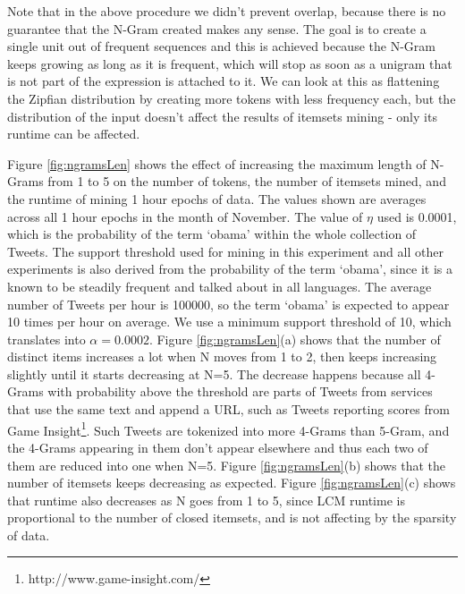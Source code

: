 \documentclass{sig-alternate}
\begin{document}
Note that in the above procedure we didn't prevent overlap, because there is no guarantee that the N-Gram created makes any sense. The goal is to create a single unit out of frequent sequences and this is achieved because the N-Gram keeps growing as long as it is frequent, which will stop as soon as a unigram that is not part of the expression is attached to it. We can look at this as flattening the Zipfian distribution by creating more tokens with less frequency each, but the distribution of the input doesn't affect the results of itemsets mining - only its runtime can be affected.

Figure \ref{fig:ngramsLen} shows the effect of increasing the maximum length of N-Grams from 1 to 5 on the number of tokens, the number of itemsets mined, and the runtime of mining 1 hour epochs of data. The values shown are averages across all 1 hour epochs in the month of November. The value of $\eta$ used is 0.0001, which is the probability of the term `obama' within the whole collection of Tweets. The support threshold used for mining in this experiment and all other experiments is also derived from the probability of the term `obama', since it is a known to be steadily frequent and talked about in all languages. The average number of Tweets per hour is 100000, so the term `obama' is expected to appear 10 times per hour on average. We use a minimum support threshold of 10, which translates into $\alpha = 0.0002$. Figure \ref{fig:ngramsLen}(a) shows that the number of distinct items increases a lot when N moves from 1 to 2, then keeps increasing slightly until it starts decreasing at N=5. The decrease happens because all 4-Grams with probability above the threshold are parts of Tweets from services that use the same text and append a URL, such as Tweets reporting scores from Game Insight\footnote{http://www.game-insight.com/}. Such Tweets are tokenized into more 4-Grams than 5-Gram, and the 4-Grams appearing in them don't appear elsewhere and thus each two of them are reduced into one when N=5.  Figure \ref{fig:ngramsLen}(b) shows that the number of itemsets keeps decreasing as expected.  Figure \ref{fig:ngramsLen}(c) shows that runtime also decreases as N goes from 1 to 5, since LCM runtime is proportional to the number of closed itemsets, and is not affecting by the sparsity of data. 
\end{document}
